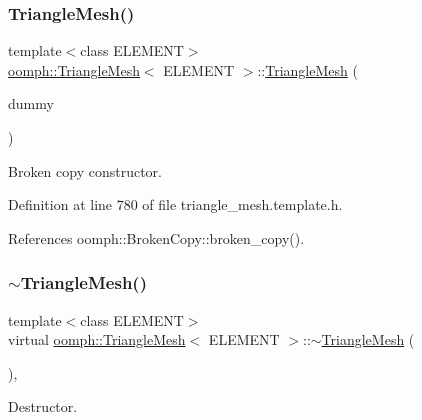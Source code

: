 \subsubsection{\texorpdfstring{Triangle\+Mesh()}{TriangleMesh()}\hspace{0.1cm}{\footnotesize\ttfamily [5/5]}}
{\footnotesize\ttfamily template$<$class E\+L\+E\+M\+E\+NT$>$ \\
\hyperlink{classoomph_1_1TriangleMesh}{oomph\+::\+Triangle\+Mesh}$<$ E\+L\+E\+M\+E\+NT $>$\+::\hyperlink{classoomph_1_1TriangleMesh}{Triangle\+Mesh} (\begin{DoxyParamCaption}\item[{const \hyperlink{classoomph_1_1TriangleMesh}{Triangle\+Mesh}$<$ E\+L\+E\+M\+E\+NT $>$ \&}]{dummy }\end{DoxyParamCaption})\hspace{0.3cm}{\ttfamily [inline]}}



Broken copy constructor. 



Definition at line 780 of file triangle\+\_\+mesh.\+template.\+h.



References oomph\+::\+Broken\+Copy\+::broken\+\_\+copy().

\mbox{\label{classoomph_1_1TriangleMesh_a1b3d8cb528c25a53faa38164600f256d}} 
\subsubsection{\texorpdfstring{$\sim$\+Triangle\+Mesh()}{~TriangleMesh()}}
{\footnotesize\ttfamily template$<$class E\+L\+E\+M\+E\+NT$>$ \\
virtual \hyperlink{classoomph_1_1TriangleMesh}{oomph\+::\+Triangle\+Mesh}$<$ E\+L\+E\+M\+E\+NT $>$\+::$\sim$\hyperlink{classoomph_1_1TriangleMesh}{Triangle\+Mesh} (\begin{DoxyParamCaption}{ }\end{DoxyParamCaption})\hspace{0.3cm}{\ttfamily [inline]}, {\ttfamily [virtual]}}



Destructor. 



